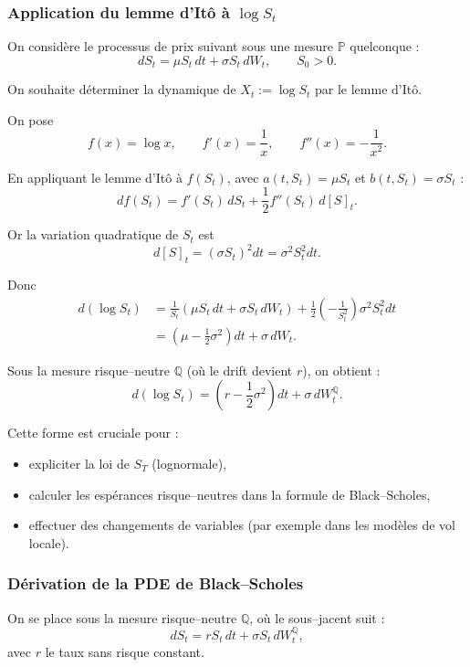 \documentclass[11pt,a4paper]{article}
\newcommand{\1}{\mathbf{1}}
\begin{document}
\subsubsection{Application du lemme d'It\^{o} \`a $\log S_t$}

On consid\`ere le processus de prix suivant sous une mesure $\mathbb{P}$ quelconque :
\[
dS_t = \mu S_t\, dt + \sigma S_t\, dW_t,
\qquad S_0 > 0.
\]

On souhaite d\'eterminer la dynamique de $X_t := \log S_t$ par le lemme d'It\^{o}.

On pose
\[
f(x) = \log x,
\qquad f'(x) = \frac{1}{x},
\qquad f''(x) = -\frac{1}{x^2}.
\]

En appliquant le lemme d'It\^{o} \`a $f(S_t)$, avec $a(t,S_t)=\mu S_t$ et $b(t,S_t)=\sigma S_t$ :
\[
df(S_t)
=
f'(S_t)\, dS_t
+ \frac12 f''(S_t)\, d[S]_t.
\]

Or la variation quadratique de $S_t$ est
\[
d[S]_t = (\sigma S_t)^2 dt = \sigma^2 S_t^2 dt.
\]

Donc
\[
\begin{aligned}
d(\log S_t)
&= \frac{1}{S_t} (\mu S_t\, dt + \sigma S_t\, dW_t)
  + \frac12 \left(-\frac{1}{S_t^2}\right) \sigma^2 S_t^2 dt \\
&= \left(\mu - \frac12 \sigma^2\right) dt + \sigma\, dW_t.
\end{aligned}
\]

Sous la mesure risque--neutre $\mathbb{Q}$ (o\`u le drift devient $r$), on obtient :
\[
d(\log S_t) = \left(r - \frac12 \sigma^2\right) dt + \sigma\, dW_t^{\mathbb{Q}}.
\]

Cette forme est cruciale pour :
\begin{itemize}
  \item expliciter la loi de $S_T$ (lognormale),
  \item calculer les esp\'erances risque--neutres dans la formule de Black--Scholes,
  \item effectuer des changements de variables (par exemple dans les mod\`eles de vol locale).
\end{itemize}

\subsubsection{D\'erivation de la PDE de Black--Scholes}

On se place sous la mesure risque--neutre $\mathbb{Q}$, o\`u le sous--jacent suit :
\[
dS_t = r S_t\, dt + \sigma S_t\, dW_t^{\mathbb{Q}},
\]
avec $r$ le taux sans risque constant.
\end{document}
